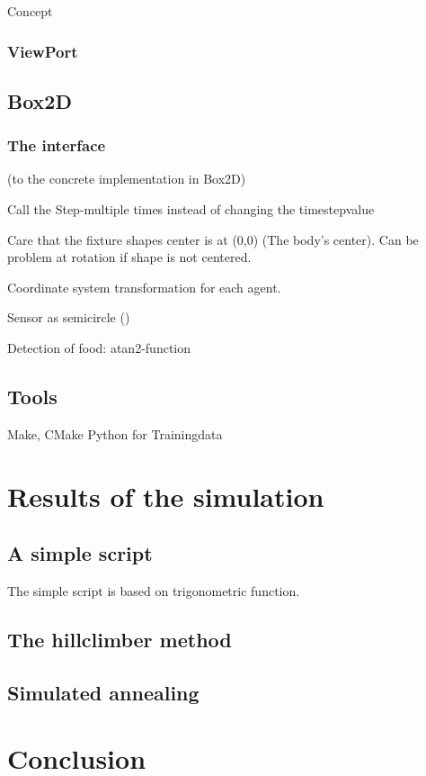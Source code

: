 \documentclass[10pt,a4paper,DIV=11]{scrreprt}
\begin{document}
Concept

\subsection{ViewPort}

\section{Box2D}

\subsection{The interface}
(to the concrete implementation in Box2D)


Call the Step-multiple times instead of changing the timestepvalue

Care that the fixture shapes center is at (0,0) (The body's center). Can be problem at rotation if shape is not centered.

Coordinate system transformation for each agent.

Sensor as semicircle (\cite{iforce})

Detection of food: atan2-function

\section{Tools}
Make, CMake
Python for Trainingdata



\chapter{Results of the simulation}

\section{A simple script}
The simple script is based on trigonometric function.

\section{The hillclimber method}

\section{Simulated annealing}



\chapter{Conclusion}
\end{document}
